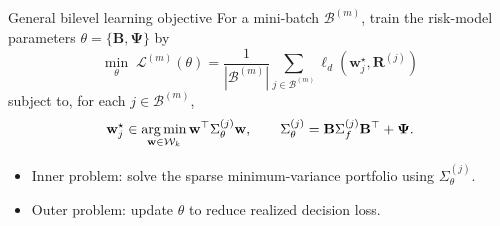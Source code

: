 \documentclass[10pt,aspectratio=169]{beamer}
\newcommand{\Kcard}{k}
\newcommand{\Wset}{\mathcal{W}}
\newcommand{\Bset}{\mathcal{B}}
\newcommand{\Loss}{\mathcal{L}}
\newcommand{\Param}{\theta}
\newcommand{\SigmaMat}{\Sigma}
\begin{document}
\begin{frame}{General bilevel learning objective}
  \small 
  For a mini-batch $\Bset^{(m)}$, train the risk-model parameters
  $\Param=\{\mathbf B,\boldsymbol{\Psi}\}$ by
  \[
    \min_{\Param}\;
    \Loss^{(m)}(\Param)
    =
    \frac{1}{|\Bset^{(m)}|}
    \sum_{j\in\Bset^{(m)}}
    \ell_d\!\left(\mathbf w_j^\star,\mathbf R^{(j)}\right)
  \]
  subject to, for each $j\in\Bset^{(m)}$,
  \[
    \mathbf w_j^\star
    \in
    \argmin_{\mathbf w\in\Wset_\Kcard}
    \mathbf w^\top \SigmaMat_\Param^{(j)} \mathbf w,
    \qquad
    \SigmaMat_\Param^{(j)}
    =
    \mathbf B\SigmaMat_f^{(j)}\mathbf B^\top+\boldsymbol{\Psi}.
  \]

  \begin{itemize}
    \item Inner problem: solve the sparse minimum-variance portfolio using
      $\SigmaMat_\Param^{(j)}$.
    \item Outer problem: update $\Param$ to reduce realized decision loss.
  \end{itemize}
\end{frame}
\end{document}
